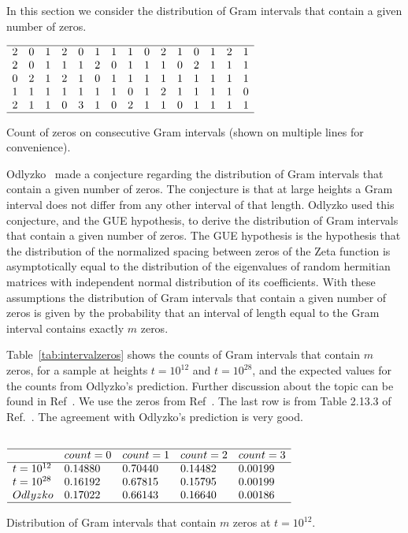 \documentclass[twoside]{article}
\begin{document}
In this section we consider the distribution of Gram intervals that contain a given number of zeros. 
\begin{table}
\centering \(\begin{array}{ccccccccccccccc}
\hline
2& 0& 1& 2& 0& 1& 1& 1& 0& 2& 1& 0& 1& 2& 1 \\
2& 0& 1& 1& 1& 2& 0& 1& 1& 1& 0& 2& 1& 1& 1 \\
0& 2& 1& 2& 1& 0& 1& 1& 1& 1& 1& 1& 1& 1& 1 \\
1& 1& 1& 1& 1& 1& 1& 0& 1& 2& 1& 1& 1& 1& 0 \\
2& 1& 1& 0& 3& 1& 0& 2& 1& 1& 0& 1& 1& 1& 1 \\
\hline
\end{array}\)
\caption{Count of zeros on consecutive Gram intervals (shown on multiple lines for convenience).} 
\label{tab:sequence}
\end{table}

 Odlyzko~\cite{Odlyzko 1992} made a conjecture regarding the distribution of Gram intervals that contain a given number of zeros. The conjecture is that at large heights a Gram interval does not differ from any other interval of that length. Odlyzko used this conjecture, and the GUE hypothesis, to derive the distribution of Gram intervals that contain a given number of zeros.  
The GUE hypothesis  is the hypothesis that the distribution of the normalized spacing between zeros of the Zeta function is asymptotically equal to the distribution of the eigenvalues of random hermitian matrices with independent normal distribution of its coefficients. With these assumptions the distribution of Gram intervals that contain a given number of zeros is given by the probability that an interval of length equal to the Gram interval contains exactly $m$ zeros. 

Table~\ref{tab:intervalzeros} shows the counts of Gram intervals that contain $m$ zeros, for a sample at heights  $t=10^{12}$ and $t=10^{28}$, and the  expected values for the counts from Odlyzko's prediction. Further discussion about the topic can be found in Ref~\cite{Shanker 2018a}. We use the zeros from Ref~\cite{hiary 2010}. The last row is from Table 2.13.3 of Ref.~\cite{Odlyzko 1992}. The agreement with Odlyzko's prediction is very good. 


\begin{table}
\centering \(\begin{array}{lllll}\\
\hline
 &count = 0&count = 1&count = 2&count = 3\\
\hline
t = 10^{12}&0.14880&0.70440&0.14482&0.00199\\
t = 10^{28}&0.16192&0.67815&0.15795&0.00199\\
Odlyzko&0.17022&0.66143&0.16640&0.00186\\
\hline
\end{array}\)
\caption{Distribution of Gram intervals that contain $m$ zeros at  $t=10^{12}$.} 
\label{tab:intervalzeros}
\end{table}
\end{document}
